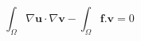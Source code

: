 \documentclass{article}
\begin{document}
$$
\int_{\Omega}{\nabla\textbf{u}\cdot\nabla\textbf{v}} -\int_{\Omega}{\textbf{f}.\textbf{v}} = 0
$$
\end{document}
